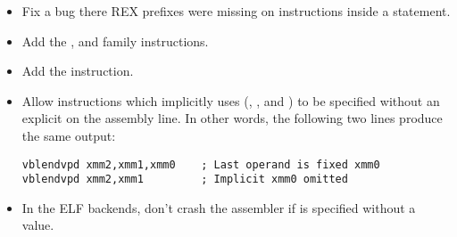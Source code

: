 
\begin{itemize}
    \item{Fix a bug there REX prefixes were missing on instructions
        inside a  statement.}
\end{itemize}


\begin{itemize}
    \item{Add the ,  and  family instructions.}
    \item{Add the  instruction.}
\end{itemize}


\begin{itemize}
    \item{Allow instructions which implicitly uses  (,
        ,  and ) to be specified
        without an explicit  on the assembly line. In other words,
        the following two lines produce the same output:
\begin{lstlisting}
vblendvpd xmm2,xmm1,xmm0    ; Last operand is fixed xmm0
vblendvpd xmm2,xmm1         ; Implicit xmm0 omitted
\end{lstlisting}}

    \item{In the ELF backends, don't crash the assembler if 
        is specified without a value.}
\end{itemize}


